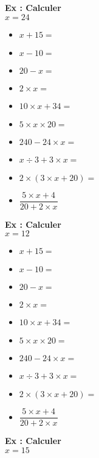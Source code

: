 \begin{multicols}{3}
  
  \textbf{Ex : Calculer} \\
  
  $x = 24$ 
  
  \begin{itemize}[label={$\bullet$}]
    \item $x + 15 = $ \dotfill
    \item $x - 10 = $ \dotfill
    \item $20 - x = $ \dotfill
    \item $2 \times x = $ \dotfill
    \item $10 \times x + 34 = $ \dotfill
    \item $5 \times  x \times 20 = $ \dotfill
    \item $240 - 24 \times x = $ \dotfill
    \item $x \div 3 + 3 \times x = $ \dotfill
    \item $2 \times (3  \times x + 20) = $ \dotfill
    \item $\dfrac{5 \times x + 4}{20 + 2 \times x}$ \dotfill
  \end{itemize} \columnbreak
  
  \textbf{Ex : Calculer} \\
  
  $x = 12$ 
  
  \begin{itemize}[label={$\bullet$}]
    \item $x + 15 = $ \dotfill
    \item $x - 10 = $ \dotfill
    \item $20 - x = $ \dotfill
    \item $2 \times x = $ \dotfill
    \item $10 \times x + 34 = $ \dotfill
    \item $5 \times  x \times 20 = $ \dotfill
    \item $240 - 24 \times x = $ \dotfill
    \item $x \div 3 + 3 \times x = $ \dotfill
    \item $2 \times (3  \times x + 20) = $ \dotfill
    \item $\dfrac{5 \times x + 4}{20 + 2 \times x}$ \dotfill
  \end{itemize} \columnbreak
  
  \textbf{Ex : Calculer} \\
  
  $x = 15$ 
  

\end{multicols}
